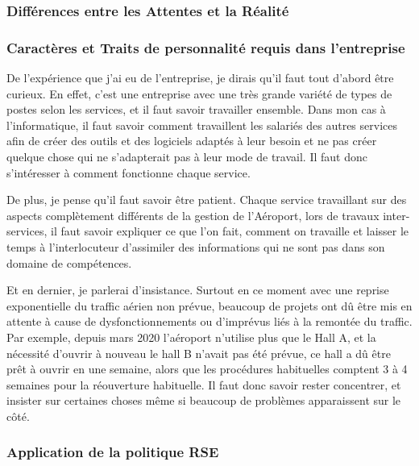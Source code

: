 \subsubsection*{Différences entre les Attentes et la Réalité}




\subsubsection*{Caractères et Traits de personnalité requis dans l'entreprise}

De l'expérience que j'ai eu de l'entreprise, je dirais qu'il faut tout d'abord être curieux. En effet, c'est une entreprise avec une très grande variété de types de postes selon les services, et il faut savoir travailler ensemble.
Dans mon cas à l'informatique, il faut savoir comment travaillent les salariés des autres services afin de créer des outils et des logiciels adaptés à leur besoin et ne pas créer quelque chose qui ne s'adapterait pas à leur mode de travail.
Il faut donc s'intéresser à comment fonctionne chaque service.\newline

De plus, je pense qu'il faut savoir être patient. Chaque service travaillant sur des aspects complètement différents de la gestion de l'Aéroport, lors de travaux inter-services, il faut savoir expliquer ce que l'on fait, comment on travaille et laisser le temps à l'interlocuteur d'assimiler des informations qui ne sont pas dans son domaine de compétences.\newline

Et en dernier, je parlerai d'insistance. Surtout en ce moment avec une reprise exponentielle du traffic aérien non prévue, beaucoup de projets ont dû être mis en attente à cause de dysfonctionnements ou d'imprévus liés à la remontée du traffic.
Par exemple, depuis mars 2020 l'aéroport n'utilise plus que le Hall A, et la nécessité d'ouvrir à nouveau le hall B n'avait pas été prévue, ce hall a dû être prêt à ouvrir en une semaine, alors que les procédures habituelles comptent 3 à 4 semaines pour la réouverture habituelle.
Il faut donc savoir rester concentrer, et insister sur certaines choses même si beaucoup de problèmes apparaissent sur le côté.

\subsubsection*{Application de la politique RSE}


